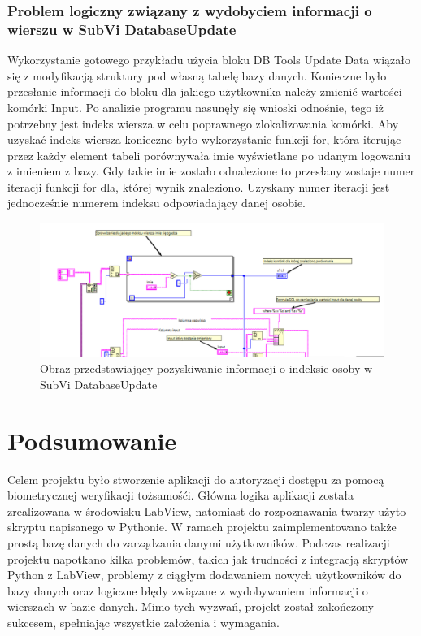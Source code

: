 \documentclass{report}
\begin{document}
\subsubsection{\large Problem logiczny związany z wydobyciem informacji o wierszu w SubVi DatabaseUpdate}

Wykorzystanie gotowego przykładu użycia bloku DB Tools Update Data wiązało się z modyfikacją struktury pod własną tabelę bazy danych.
Konieczne było przesłanie informacji do bloku dla jakiego użytkownika należy zmienić wartości komórki Input. Po analizie programu nasunęły się wnioski
odnośnie, tego iż potrzebny jest indeks wiersza w celu poprawnego zlokalizowania komórki. Aby uzyskać indeks wiersza konieczne było wykorzystanie funkcji for, 
która iterując przez każdy element tabeli porównywała imie wyświetlane po udanym logowaniu z imieniem z bazy. Gdy takie imie zostało odnalezione 
to przesłany zostaje numer iteracji funkcji for dla, której wynik znaleziono. Uzyskany numer iteracji jest jednocześnie numerem indeksu odpowiadający danej osobie.

\begin{figure}[H]
    \centering
    \includegraphics[width=1.0\textwidth]{src/Database/Update_iteration.png}
    \caption{Obraz przedstawiający pozyskiwanie informacji o indeksie osoby w SubVi DatabaseUpdate}
    \label{fig:first-att}
\end{figure}

\section{\LARGE Podsumowanie}

Celem projektu było stworzenie aplikacji do autoryzacji dostępu za pomocą biometrycznej weryfikacji tożsamośći. Główna logika aplikacji została zrealizowana w środowisku LabView, natomiast do rozpoznawania twarzy użyto skryptu napisanego w Pythonie. W ramach projektu zaimplementowano także prostą bazę danych do zarządzania danymi użytkowników. Podczas realizacji projektu napotkano kilka problemów, takich jak trudności z integracją skryptów Python z LabView, problemy z ciągłym dodawaniem nowych użytkowników do bazy danych oraz logiczne błędy związane z wydobywaniem informacji o wierszach w bazie danych. Mimo tych wyzwań, projekt został zakończony sukcesem, spełniając wszystkie założenia i wymagania.
\end{document}
